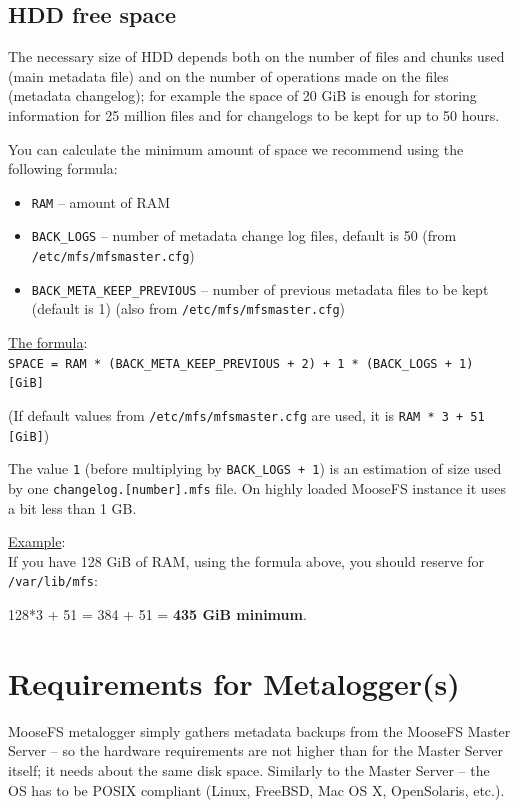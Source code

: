 \documentclass[a4paper,11pt,english]{report}
\def\code#1{\texttt{#1}}
\begin{document}
			\subsection{HDD free space}
		
			The necessary size of HDD depends both on the number of files and chunks used (main metadata file) and on the number of operations made on the files (metadata changelog); for example the space of 20 GiB is enough for storing information for 25 million files and for changelogs to be kept for up to 50 hours.
			
			You can calculate the minimum amount of space we recommend using the following formula:
			\begin{itemize}
				\item \code{RAM} -- amount of RAM
				\item \code{BACK\_LOGS} -- number of metadata change log files, default is 50 (from \code{/etc/mfs/mfsmaster.cfg})
				\item \code{BACK\_META\_KEEP\_PREVIOUS} -- number of previous metadata files to be kept (default is 1) (also from \code{/etc/mfs/mfsmaster.cfg})
			\end{itemize}
			
			\bigskip
			\underline{The formula}: \\
			\code{SPACE = RAM * (BACK\_META\_KEEP\_PREVIOUS + 2) + 1 * (BACK\_LOGS + 1) [GiB]}
			\bigskip
			
			(If default values from \code{/etc/mfs/mfsmaster.cfg} are used, it is \code{RAM * 3 + 51 [GiB]})
			
			The value \code{1} (before multiplying by \code{BACK\_LOGS + 1}) is an estimation of size used by one \code{changelog.[number].mfs} file. On highly loaded MooseFS instance it uses a bit less than 1 GB.
			
			\underline{Example}: \\
			If you have 128 GiB of RAM, using the formula above, you should reserve for \code{/var/lib/mfs}:
			
			128*3 + 51 = 384 + 51 = \textbf{435 GiB minimum}.
		
		\section{Requirements for Metalogger(s)}
		MooseFS metalogger simply gathers metadata backups from the MooseFS Master Server -- so the hardware requirements are not higher than for the Master Server itself; it needs about the same disk space. Similarly to the Master Server -- the OS has to be POSIX compliant (Linux, FreeBSD, Mac OS X, OpenSolaris, etc.).\\
		
\end{document}

